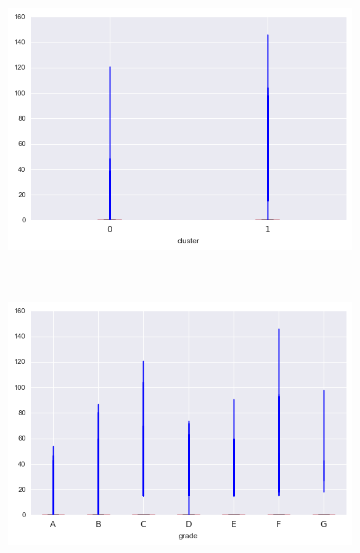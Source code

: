 \begin{anexosenv}
\begin{figure}[t!]
\begin{subfigure}[t]{0.5\textwidth}
            \centerline{\includegraphics[width=1\textwidth]{img/total_rec_late_fee_by_cluster}}
        \end{subfigure}%
        ~ 
        \begin{subfigure}[t]{0.5\textwidth}
            \centering
   
            \centerline{\includegraphics[width=1\textwidth]{img/total_rec_late_fee_by_grade}}

        \end{subfigure}
                \\
                \caption{dti}
        \begin{subfigure}[t]{0.5\textwidth}
            \centering


\end{subfigure}
\end{figure}
\end{anexosenv}
